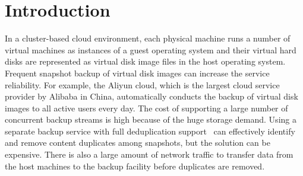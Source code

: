 \section{Introduction}
In a cluster-based cloud environment,
each physical machine runs a number  of virtual machines as  instances of a guest operating system 
and their  virtual hard disks are represented as virtual disk image files in the host operating system.
Frequent  snapshot backup of virtual disk images  can increase  the service reliability. 
For example, the Aliyun cloud, which is  the largest cloud service provider by Alibaba in China, 
automatically conducts  the backup of virtual disk images to all active users every day.
The cost of supporting a large number of concurrent backup streams is high
because of the huge storage demand. 
Using a separate  backup service with full deduplication support~\cite{venti02,bottleneck08}
can effectively identify and remove content duplicates among snapshots, 
but the solution can be expensive. There is also a large amount of 
network traffic to transfer  data from the host machines to the backup facility
before duplicates are removed.


